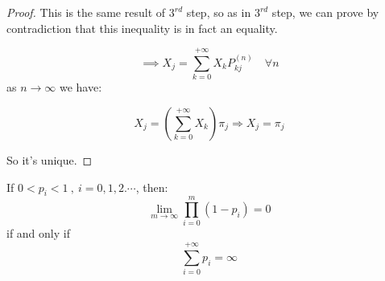 \begin{proof}
			This is the same result of $3^{rd}$ step, so as in $3^{rd}$ step, we can prove by contradiction that this inequality is in fact an equality.

			$$ \implies X_j = \sum\limits_{k=0}^{+\infty} X_k P_{kj}^{(n)} \quad \forall n $$
			as $n \to \infty$ we have:

			\begin{equation}
				X_j = (\sum\limits_{k=0}^{+\infty} X_k ) \pi_j \Rightarrow X_j = \pi_j
			\end{equation}

			So it's unique.
	\end{proof}

	\begin{lemma}
	  If $0 < p_i < 1 ~,~ i=0,1,2.\cdots $, then:
		\begin{equation}\label{limprodpi}
			\lim_{m \to \infty} \prod_{i=0}^{m}(1-p_i) = 0
		\end{equation}
		if and only if
		\begin{equation}\label{pitoinfty}
			\sum\limits_{i=0}^{+\infty} p_i = \infty
		\end{equation}
	\end{lemma}

